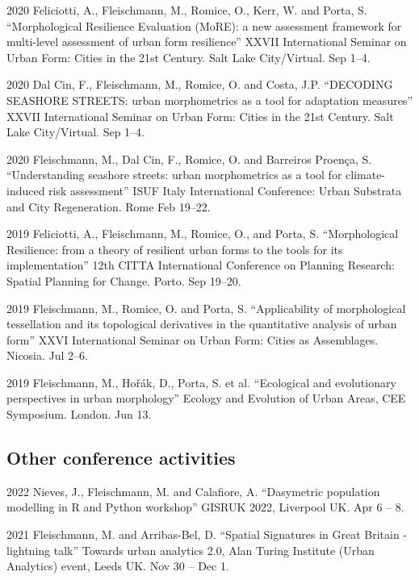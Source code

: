 \documentclass[12pt,a4paper]{report}
\begin{document}
\begin{tablist}
        \item[2020] \tab{}Feliciotti, A., Fleischmann, M., Romice, O., Kerr, W. and Porta, S. \enquote{Morphological Resilience Evaluation (MoRE): a new assessment framework for multi-level assessment of urban form resilience} XXVII International Seminar on Urban Form: Cities in the 21st Century. Salt Lake City/Virtual. \@ Sep 1--4.

        \item[2020] \tab{}Dal Cin, F., Fleischmann, M., Romice, O. and Costa, J.P. \enquote{DECODING SEASHORE STREETS: urban morphometrics as a tool for adaptation measures} XXVII International Seminar on Urban Form: Cities in the 21st Century. Salt Lake City/Virtual. \@ Sep 1--4.

        \item[2020] \tab{}Fleischmann, M., Dal Cin, F., Romice, O. and Barreiros Proença, S. \enquote{Understanding seashore streets: urban morphometrics as a tool for climate-induced risk assessment} ISUF Italy International Conference: Urban Substrata and City Regeneration. Rome \@ Feb 19--22.

        \item[2019] \tab{}Feliciotti, A., Fleischmann, M., Romice, O., and Porta, S.  \enquote{Morphological Resilience: from a theory of resilient urban forms to the tools for its implementation} 12th CITTA International Conference on Planning Research: Spatial Planning for Change. Porto. \@ Sep 19--20.

        \item[2019] \tab{}Fleischmann, M., Romice, O. and Porta, S. \enquote{Applicability of morphological tessellation and its topological derivatives in the quantitative analysis of urban form} XXVI International Seminar on Urban Form: Cities as Assemblages. Nicosia. \@ Jul 2--6.

        \item[2019] \tab{}Fleischmann, M., Hořák, D., Porta, S. et al. \enquote{Ecological and evolutionary perspectives in urban morphology} Ecology and Evolution of Urban Areas, CEE Symposium. London. \@ Jun 13.


    \end{tablist}

    \subsection*{Other conference activities}

    \begin{tablist}

        \item[2022] \tab{}Nieves, J., Fleischmann, M. and Calafiore, A. \enquote{Dasymetric population modelling in R and Python workshop} GISRUK 2022, Liverpool UK. Apr 6 -- 8.
        \item[2021] \tab{}Fleischmann, M. and Arribas-Bel, D. \enquote{Spatial Signatures in Great Britain - lightning talk} Towards urban analytics 2.0, Alan Turing Institute (Urban Analytics) event, Leeds UK. Nov 30 -- Dec 1.

    \end{tablist}
\end{document}
